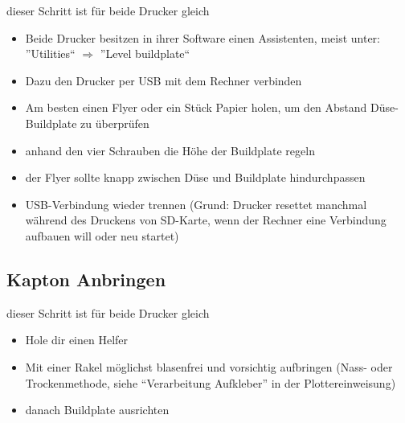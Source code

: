 \documentclass{\basedir/fablab-document}
\begin{document}
dieser Schritt ist für beide Drucker gleich
\begin{itemize}
\item Beide Drucker besitzen in ihrer Software einen Assistenten, meist unter: ''Utilities`` $\Rightarrow$ ''Level buildplate``
\item Dazu den Drucker per USB mit dem Rechner verbinden
\item Am besten einen Flyer oder ein Stück Papier holen, um den Abstand Düse-Buildplate zu überprüfen
\item anhand den vier Schrauben die Höhe der Buildplate regeln
\item der Flyer sollte knapp zwischen Düse und Buildplate hindurchpassen
\item USB-Verbindung wieder trennen (Grund: Drucker resettet manchmal während des Druckens von SD-Karte, wenn der Rechner eine Verbindung aufbauen will oder neu startet)
\end{itemize}

\subsection{Kapton Anbringen}

dieser Schritt ist für beide Drucker gleich
\begin{itemize}
\item Hole dir einen Helfer
\item Mit einer Rakel möglichst blasenfrei und vorsichtig aufbringen (Nass- oder Trockenmethode, siehe \enquote{Verarbeitung Aufkleber} in der Plottereinweisung)
\item danach Buildplate ausrichten
\end{itemize}
\end{document}
